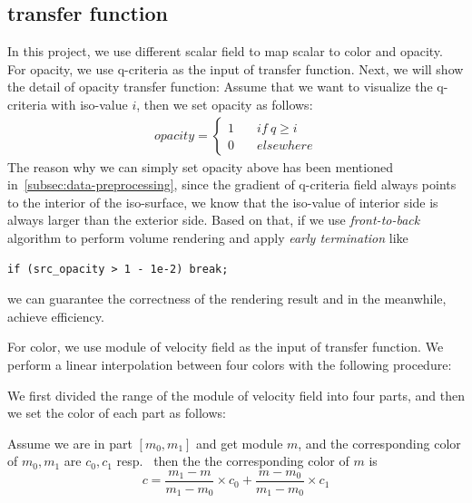 \documentclass[acmtog]{acmart}
\begin{document}
    \subsection{transfer function}\label{subsec:transfer-function}
    In this project, we use different scalar field to map scalar to color and opacity.
    For opacity, we use q-criteria as the input of transfer function.
    Next, we will show the detail of opacity transfer function:
    Assume that we want to visualize the q-criteria with iso-value $i$, then we set opacity as follows:
    \begin{align*}
        opacity = \left\{
        \begin{aligned}
            1&\quad if\ q \geq i\\
            0&\quad elsewhere
        \end{aligned}
        \right.
    \end{align*}
    The reason why we can simply set opacity above has been mentioned in~\ref{subsec:data-preprocessing}, since the gradient of q-criteria field always points to the interior of the iso-surface, we know that the iso-value of interior side is always larger than the exterior side.
    Based on that, if we use \emph{front-to-back} algorithm to perform volume rendering and apply \emph{early termination} like
    \begin{lstlisting}[label={lst:lstlisting}]
        if (src_opacity > 1 - 1e-2) break;
    \end{lstlisting}
    we can guarantee the correctness of the rendering result and in the meanwhile, achieve efficiency.

    For color, we use module of velocity field as the input of transfer function.
    We perform a linear interpolation between four colors with the following procedure:

    We first divided the range of the module of velocity field into four parts, and then we set the color of each part as follows:

    Assume we are in part $[m_0, m_1]$ and get module $m$, and the corresponding color of $m_0,m_1$ are $c_0, c_1$ resp.~ then the the corresponding color of $m$ is
    \[c=\frac{m_1-m}{m_1-m_0}\times c_0 + \frac{m-m_0}{m_1-m_0}\times c_1\]
\end{document}
